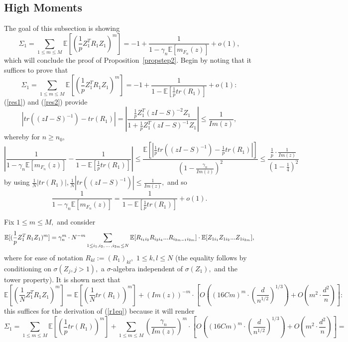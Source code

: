 \documentclass{article}
\numberwithin{equation}{section}
\begin{document}
\subsection{High Moments}\label{subsect3.3}

The goal of this subsection is showing
\[\Sigma_1=\sum_{1 \leq m \leq M}{\mathbb{E}[(\frac{1}{p}Z_1^TR_1Z_1)^m]}=-1+\frac{1}{1-\gamma_n\mathbb{E}[m_{F_n}(z)]}+o(1),\]
which will conclude the proof of Proposition~\ref{propstep2}. Begin by noting that it suffices to prove that
\begin{equation}\label{r1eq}
    \Sigma_1=\sum_{1 \leq m \leq M}{\mathbb{E}[(\frac{1}{p}Z_1^TR_1Z_1)^m]}=-1+\frac{1}{1-\mathbb{E}[\frac{1}{p}tr(R_1)]}+o(1):
\end{equation}
(\ref{res1}) and (\ref{res2}) provide
\[|tr((zI-S)^{-1})-tr(R_1)|=|\frac{\frac{1}{p}Z_1^T(zI-S)^{-2}Z_1}{1+\frac{1}{p}Z_1^T(zI-S)^{-1}Z_1}| \leq \frac{1}{Im(z)},\]
whereby for \(n \geq n_0,\)
\[|\frac{1}{1-\gamma_n\mathbb{E}[m_{F_n}(z)]}-\frac{1}{1-\mathbb{E}[\frac{1}{p}tr(R_1)]}| \leq \frac{\mathbb{E}[|\frac{1}{p}tr((zI-S)^{-1})-\frac{1}{p}tr(R_1)|]}{(1-\frac{\gamma_n}{Im(z)})^2} \leq \frac{\frac{1}{p} \cdot \frac{1}{Im(z)}}{(1-\frac{1}{4})^2}\]
by using \(\frac{1}{N}|tr(R_1)|,\frac{1}{N}|tr((zI-S)^{-1})| \leq \frac{1}{Im(z)},\) and so
\[\frac{1}{1-\gamma_n\mathbb{E}[m_{F_n}(z)]}=\frac{1}{1-\mathbb{E}[\frac{1}{p}tr(R_1)]}+o(1).\]
\par
Fix \(1 \leq m \leq M,\) and consider
\begin{equation}\label{sumexp}
    \mathbb{E}[(\frac{1}{p}Z_1^TR_1Z_1)^m]=\gamma_n^m \cdot N^{-m}\sum_{1 \leq i_1,i_2,\hspace{0.05cm}...\hspace{0.05cm},i_{2m} \leq N}{\mathbb{E}[R_{i_1i_2}R_{i_3i_4}...R_{i_{2m-1}i_{2m}}] \cdot \mathbb{E}[Z_{1i_1}Z_{1i_2}...Z_{1i_{2m}}]},
\end{equation}
where for ease of notation \(R_{kl}:=(R_1)_{kl},\) \(1 \leq k,l \leq N\) (the equality follows by conditioning on \(\sigma(Z_{j},j>1),\) a \(\sigma\)-algebra independent of \(\sigma(Z_1),\) and the tower property). It is shown next that
\begin{equation}\label{indbd}
    \mathbb{E}[(\frac{1}{N}Z_1^TR_1Z_1)^m]=\mathbb{E}[(\frac{1}{N}tr(R_1))^m]+(Im(z))^{-m} \cdot [O((16Cm)^{m} \cdot (\frac{d}{n^{1/2}})^{1/3})+O(m^2 \cdot \frac{d^2}{n})]:
\end{equation}
this suffices for the derivation of (\ref{r1eq}) because it will render
\[\Sigma_1=\sum_{1 \leq m \leq M}{\mathbb{E}[(\frac{1}{p}tr(R_1))^m]}+\sum_{1 \leq m \leq M}{(\frac{\gamma_n}{Im(z)})^m \cdot [O((16Cm)^{m} \cdot (\frac{d}{n^{1/2}})^{1/3})+O(m^2 \cdot \frac{d^2}{n})]}=\]
\end{document}
